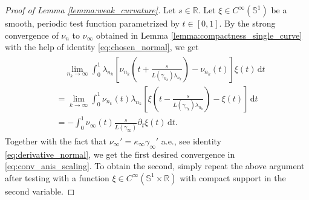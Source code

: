 \documentclass[11pt]{article}
\numberwithin{statement}{section}
\numberwithin{equation}{section}
\theoremstyle{remark}
\newcommand{\R}{\mathbb R} 				%
\newcommand{\intd}{\, \mathrm{d}} 				%
\newcommand{\Sph}{{\mathbb S}}				%
\begin{document}
\begin{proof}[Proof of Lemma \ref{lemma:weak_curvature}]
  Let $s\in \R$.  Let $\xi \in C^\infty(\Sph^1)$ be a smooth, periodic
  test function parametrized by $t \in [0,1]$.  By the strong
  convergence of $\nu_n$ to $\nu_\infty$ obtained in Lemma
  \ref{lemma:compactness_single_curve} with the help of identity
    \eqref{eq:chosen_normal}, we get
	\begin{align}
	  \begin{split}
            & \quad \lim_{n_k \to \infty} \int_0^1 \lambda_{n_k}
            \left[ \nu_{n_k}\left(t+\frac{s}{L(\gamma_{n_k})
                  \lambda_{n_k}}\right) -
              \nu_{n_k}(t)\right] \xi (t)\intd t \\
            & = \lim_{k \to \infty} \int_0^1 \nu_{n_k}(t)
            \lambda_{n_k} \left[\xi\left(t-\frac{s}{L(\gamma_{n_k})
                  \lambda_{n_k} }\right)-
              \xi(t) \right]  \intd t\\
            & = - \int_0^1 \nu_\infty(t) \frac{s}{L(\gamma_\infty)}
            \partial_t \xi(t)\intd t.
	  \end{split}
	\end{align}
      Together with the fact that
      $ \nu_\infty' = \kappa_\infty \gamma_{\infty}'$ a.e., see
      identity \eqref{eq:derivative_normal}, we get the first desired
      convergence in \eqref{eq:conv_anis_scaling}.  To obtain the
      second, simply repeat the above argument after testing with a
      function $\xi \in C^\infty(\Sph^1\times \R)$ with compact
      support in the second variable.
\end{proof}
\end{document}

